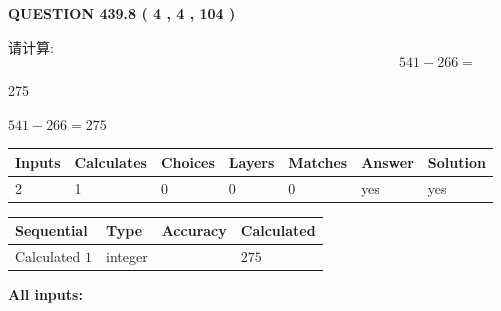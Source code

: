 \documentclass{ctexart}
\begin{document}
{\textbf{\Large{QUESTION
439.8 
 ( 4 , 4 , 104 )
}}}
  
  
 
请计算:
\begin{equation}
541 -   %
266 = \nonumber
\end{equation}
 
 
 
\noindent{}
 
 

275
 
 
\noindent{}
 
 

 
 
 
\noindent{}
 
 

$ %
541 -  %
266=   %
275$
 
 
\noindent{}
 
 

 
   
   
   
   
\noindent\begin{tabular}{|l|l|l|l|l|l|l|}
 \hline
Inputs & Calculates & Choices & Layers & Matches & Answer & Solution \\ \hline
 2  & 
 1  & 
 0
  & 
 0  & 
 0  & 
  yes & 
  yes 
  \\ \hline
 \end{tabular}
   
   
   
   
\noindent{}
   
   
  
  
\noindent\begin{tabular}{|l|l|l|l|}
\hline
 Sequential & Type & Accuracy & Calculated \\ 
\hline
 
 
  Calculated $  1 $ & integer &  & 
  $ 275 $ 
 \\  \hline  
 \end{tabular}
   
   
   
   
\noindent\vspace{0.1in}\hspace{-0.08in} {\textbf{\Large{All inputs: }}}
   
\end{document}
